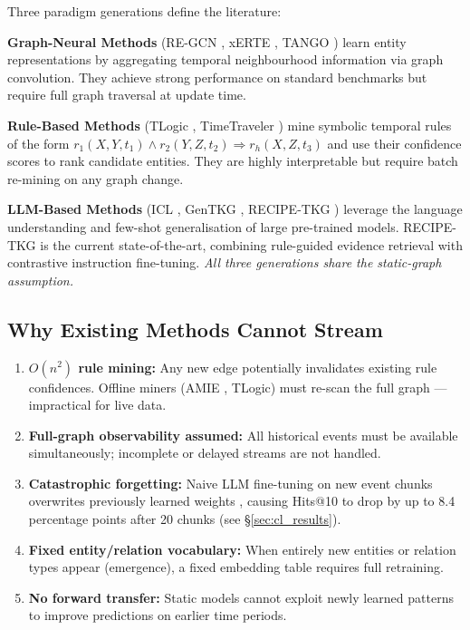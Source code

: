 \documentclass[10pt,a4paper,twocolumn]{article}
\theoremstyle{definition}
\newcommand{\basemodel}{RECIPE-TKG}
\begin{document}
Three paradigm generations define the literature:

\textbf{Graph-Neural Methods} (RE-GCN \cite{Li2021regcn}, xERTE
\cite{Han2020xerte}, TANGO \cite{Han2021tango}) learn entity representations
by aggregating temporal neighbourhood information via graph convolution.
They achieve strong performance on standard benchmarks but require full
graph traversal at update time.

\textbf{Rule-Based Methods} (TLogic \cite{Liu2022tlogic}, TimeTraveler
\cite{Sun2021timetraveler}) mine symbolic temporal rules of the form
$r_1(X,Y,t_1) \wedge r_2(Y,Z,t_2) \Rightarrow r_h(X,Z,t_3)$ and use
their confidence scores to rank candidate entities.
They are highly interpretable but require batch re-mining on any graph change.

\textbf{LLM-Based Methods} (ICL \cite{Xiong2024icl}, GenTKG
\cite{Liao2024gentkg}, \basemodel{} \cite{Akgul2025recipe}) leverage the
language understanding and few-shot generalisation of large pre-trained
models.
\basemodel{} is the current state-of-the-art, combining rule-guided evidence
retrieval with contrastive instruction fine-tuning.
\emph{All three generations share the static-graph assumption.}

\subsection{Why Existing Methods Cannot Stream}

\begin{tcolorbox}[limitbox]
\begin{enumerate}[leftmargin=1.2em,itemsep=2pt,topsep=0pt]
  \item \textbf{$O(n^2)$ rule mining:} Any new edge potentially invalidates
        existing rule confidences. Offline miners (AMIE \cite{Galárraga2013amie},
        TLogic) must re-scan the full graph — impractical for live data.
  \item \textbf{Full-graph observability assumed:} All historical events must
        be available simultaneously; incomplete or delayed streams are not
        handled.
  \item \textbf{Catastrophic forgetting:} Naive LLM fine-tuning on new event
        chunks overwrites previously learned weights \cite{McCloskey1989catastrophic},
        causing Hits@10 to drop by up to 8.4 percentage points after 20 chunks
        (see §\ref{sec:cl_results}).
  \item \textbf{Fixed entity/relation vocabulary:} When entirely new entities
        or relation types appear (emergence), a fixed embedding table requires
        full retraining.
  \item \textbf{No forward transfer:} Static models cannot exploit newly
        learned patterns to improve predictions on earlier time periods.
\end{enumerate}
\end{tcolorbox}
\end{document}

